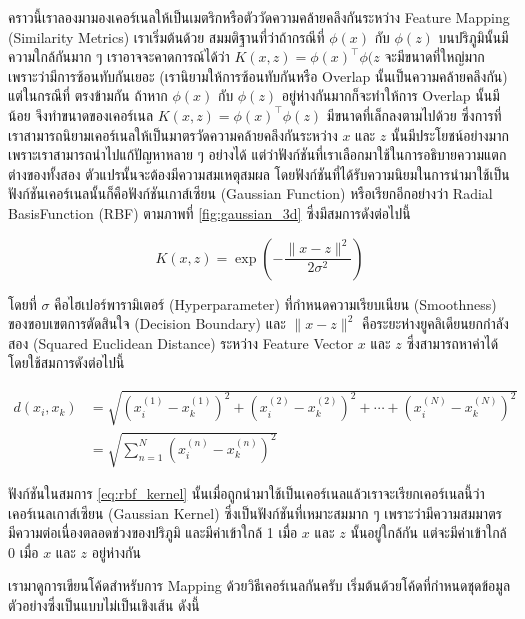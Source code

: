 คราวนี้เราลองมามองเคอร์เนลให้เป็นเมตริกหรือตัววัดความคล้ายคลึงกันระหว่าง Feature Mapping (Similarity Metrics) เราเริ่มต้นด้วย%
สมมติฐานที่ว่าถ้ากรณีที่ $\phi(x)$ กับ $\phi(z)$ บนปริภูมินั้นมีความใกล้กันมาก ๆ เราอาจจะคาดการณ์ได้ว่า $K(x,z) = \phi(x)^{\top}
    \phi(z$ จะมีขนาดที่ใหญ่มากเพราะว่ามีการซ้อนทับกันเยอะ (เรานิยามให้การซ้อนทับกันหรือ Overlap นั้นเป็นความคล้ายคลึงกัน) แต่ในกรณีที่%
ตรงข้ามกัน ถ้าหาก $\phi(x)$ กับ $\phi(z)$ อยู่ห่างกันมากก็จะทำให้การ Overlap นั้นมีน้อย จึงทำขนาดของเคอร์เนล $K(x,z) =
    \phi(x)^{\top} \phi(z)$ มีขนาดที่เล็กลงตามไปด้วย ซึ่งการที่เราสามารถนิยามเคอร์เนลให้เป็นมาตรวัดความคล้ายคลึงกันระหว่าง $x$ และ
$z$ นั้นมีประโยชน์อย่างมาก เพราะเราสามารถนำไปแก้ปัญหาหลาย ๆ อย่างได้ แต่ว่าฟังก์ชันที่เราเลือกมาใช้ในการอธิบายความแตกต่างของทั้งสอง%
ตัวแปรนั้นจะต้องมีความสมเหตุสมผล โดยฟังก์ชันที่ได้รับความนิยมในการนำมาใช้เป็นฟังก์ชันเคอร์เนลนั้นก็คือฟังก์ชันเกาส์เซียน (Gaussian
Function) หรือเรียกอีกอย่างว่า Radial BasisFunction (RBF) ตามภาพที่ \ref{fig:gaussian_3d} ซึ่งมีสมการดังต่อไปนี้

\begin{equation}\label{eq:rbf_kernel}
    K(x,z) = \exp\left(-\frac{\lVert x - z \rVert^2}{2\sigma^2}\right)
\end{equation}

\noindent โดยที่ $\sigma$ คือไฮเปอร์พารามิเตอร์ (Hyperparameter) ที่กำหนดความเรียบเนียน (Smoothness) ของขอบเขตการตัดสินใจ
(Decision Boundary) และ $\lVert x - z \rVert^2$ คือระยะห่างยูคลิเดียนยกกำลังสอง (Squared Euclidean Distance) ระหว่าง
Feature Vector $x$ และ $z$ ซึ่งสามารถหาค่าได้โดยใช้สมการดังต่อไปนี้

\begin{align}
    d(x_{i}, x_{k}) & =
    \sqrt{(x^{(1)}_{i} - x^{(1)}_{k})^{2} + (x^{(2)}_{i} - x^{(2)}_{k})^{2} + \cdots +
    (x^{(N)}_{i} - x^{(N)}_{k})^{2}}                                          \\
                    & = \sqrt{\sum^{N}_{n=1} (x^{(n)}_{i} - x^{(n)}_{k})^{2}}
\end{align}

ฟังก์ชันในสมการ \eqref{eq:rbf_kernel} นั้นเมื่อถูกนำมาใช้เป็นเคอร์เนลแล้วเราจะเรียกเคอร์เนลนี้ว่าเคอร์เนลเกาส์เซียน (Gaussian Kernel)
ซึ่งเป็นฟังก์ชันที่เหมาะสมมาก ๆ เพราะว่ามีความสมมาตร มีความต่อเนื่องตลอดช่วงของปริภูมิ และมีค่าเข้าใกล้ 1 เมื่อ $x$ และ $z$ นั้นอยู่ใกล้กัน
แต่จะมีค่าเข้าใกล้ 0 เมื่อ $x$ และ $z$ อยู่ห่างกัน

เรามาดูการเขียนโค้ดสำหรับการ Mapping ด้วยวิธีเคอร์เนลกันครับ เริ่มต้นด้วยโค้ดที่กำหนดชุดข้อมูลตัวอย่างซึ่งเป็นแบบไม่เป็นเชิงเส้น ดังนี้


